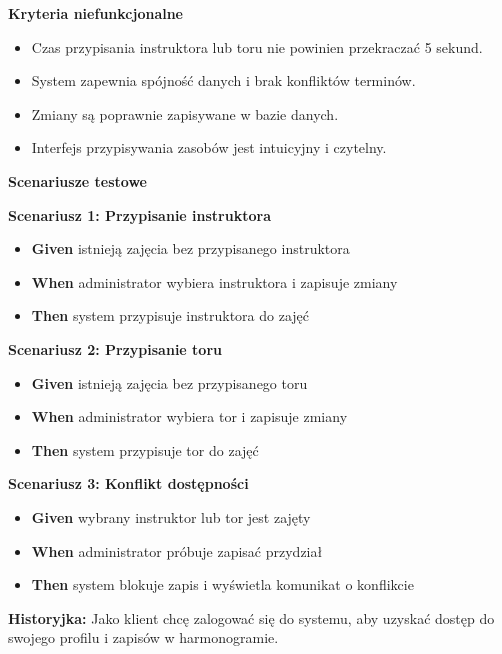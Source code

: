 \documentclass[a4paper,12pt]{article}
\begin{document}
\noindent \textbf{Kryteria niefunkcjonalne}
\begin{itemize}
    \item Czas przypisania instruktora lub toru nie powinien przekraczać 5 sekund.
    \item System zapewnia spójność danych i brak konfliktów terminów.
    \item Zmiany są poprawnie zapisywane w bazie danych.
    \item Interfejs przypisywania zasobów jest intuicyjny i czytelny.
\end{itemize}

\noindent \textbf{Scenariusze testowe}

\textbf{Scenariusz 1: Przypisanie instruktora}
\begin{itemize}
    \item \textbf{Given} istnieją zajęcia bez przypisanego instruktora
    \item \textbf{When} administrator wybiera instruktora i zapisuje zmiany
    \item \textbf{Then} system przypisuje instruktora do zajęć
\end{itemize}

\textbf{Scenariusz 2: Przypisanie toru}
\begin{itemize}
    \item \textbf{Given} istnieją zajęcia bez przypisanego toru
    \item \textbf{When} administrator wybiera tor i zapisuje zmiany
    \item \textbf{Then} system przypisuje tor do zajęć
\end{itemize}

\textbf{Scenariusz 3: Konflikt dostępności}
\begin{itemize}
    \item \textbf{Given} wybrany instruktor lub tor jest zajęty
    \item \textbf{When} administrator próbuje zapisać przydział
    \item \textbf{Then} system blokuje zapis i wyświetla komunikat o konflikcie
\end{itemize}

\vspace{0,5cm}

\noindent \textbf{Historyjka:} Jako klient chcę zalogować się do systemu, aby uzyskać dostęp do swojego profilu i zapisów w harmonogramie.

\vspace{0,2cm}
\end{document}

